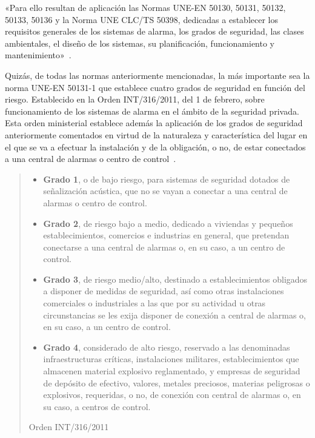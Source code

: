 «Para ello resultan de aplicación las Normas UNE-EN 50130, 50131, 50132, 50133, 50136 y la Norma UNE CLC/TS 50398, dedicadas a establecer los requisitos generales de los sistemas de alarma, los grados de seguridad, las clases ambientales, el diseño de los sistemas, su planificación, funcionamiento y mantenimiento»~\cite{BOE}.

Quizás,  de   todas  las  normas  anteriormente   mencionadas,  la  más
importante sea la norma UNE-EN  50131-1 que establece cuatro grados de
seguridad en función del riesgo. Establecido en la Orden INT/316/2011,
del 1 de febrero, sobre funcionamiento de los sistemas de alarma en el
ámbito  de  la seguridad  privada.  Esta  orden ministerial  establece
además  la  aplicación  de   los  grados  de  seguridad  anteriormente
comentados en virtud de la naturaleza y característica del lugar en el
que se va a efectuar la instalación y de la obligación, o no, de estar
conectados a una central de alarmas o centro de control~\cite{BOE}.


\begin{quote}
{\itshape
\begin{itemize}
\item \textbf{Grado 1}, o de bajo riesgo, para sistemas de seguridad dotados de señalización acústica, que no se vayan a conectar a una central de
alarmas o centro de control.
\item \textbf{Grado 2}, de riesgo bajo a medio, dedicado a viviendas y pequeños establecimientos,
comercios e industrias en general, que pretendan conectarse a una central de alarmas o,
en su caso, a un centro de control.
\item \textbf{Grado 3}, de riesgo medio/alto, destinado a establecimientos obligados a disponer
de medidas de seguridad, así como otras instalaciones comerciales o industriales a las
que por su actividad u otras circunstancias se les exija disponer de conexión a central de
alarmas o, en su caso, a un centro de control.
\item \textbf{Grado 4}, considerado de alto riesgo, reservado a las denominadas infraestructuras
críticas, instalaciones militares, establecimientos que almacenen material explosivo
reglamentado, y empresas de seguridad de depósito de efectivo, valores, metales
preciosos, materias peligrosas o explosivos, requeridas, o no, de conexión con central de
alarmas o, en su caso, a centros de control.
\end{itemize}
}
\nopagebreak
\par\nointerlineskip\noindent\hfill Orden INT/316/2011~\cite{BOE}
\end{quote}

